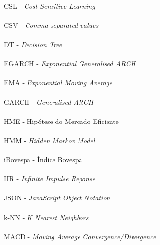 \paragraph{}CSL - \textit{Cost Sensitive Learning}
\paragraph{}CSV - \textit{Comma-separated values}
\paragraph{}DT - \textit{Decision Tree}
\paragraph{}EGARCH - \textit{Exponential Generalised ARCH}
\paragraph{}EMA - \textit{Exponential Moving Average}
\paragraph{}GARCH - \textit{Generalised ARCH}
\paragraph{}HME - Hipótese do Mercado Eficiente
\paragraph{}HMM - \textit{Hidden Markov Model}
\paragraph{}iBovespa - Índice Bovespa
\paragraph{}IIR - \textit{Infinite Impulse Reponse}
\paragraph{}JSON - \textit{JavaScript Object Notation}
\paragraph{}k-NN - \textit{K Nearest Neighbors}
\paragraph{}MACD - \textit{Moving Average Convergence/Divergence}
